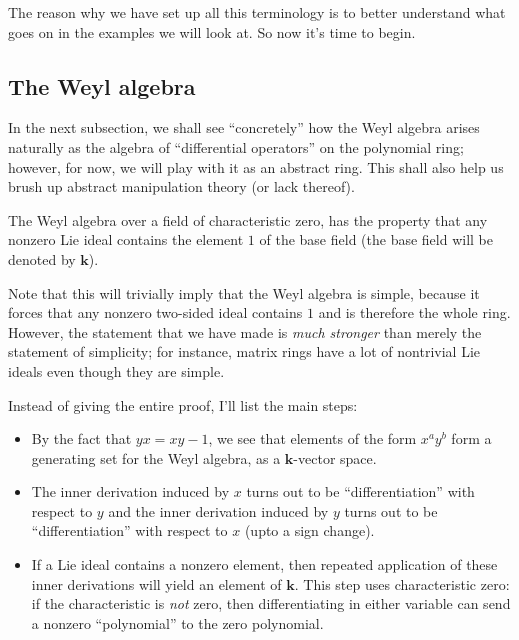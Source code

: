 \documentclass[a4paper]{amsart}
\newcommand{\field}{\mathbf{k}}
\begin{document}
The reason why we have set up all this terminology is to better understand
what goes on in the examples we will look at. So now it's time to begin.

\subsection{The Weyl algebra}

In the next subsection, we shall see ``concretely'' how the Weyl algebra
arises naturally as the algebra of ``differential operators'' on the
polynomial ring; however, for now, we will play with it as an abstract
ring. This shall also help us brush up abstract manipulation theory
(or lack thereof).

\begin{theorem}
  The Weyl algebra over a field of characteristic zero, has the
  property that any nonzero Lie ideal contains the element $1$ of the
  base field (the base field will be denoted by $\field$).
\end{theorem}

Note that this will trivially imply that the Weyl algebra is simple,
because it forces that any nonzero two-sided ideal contains $1$ and is
therefore the whole ring. However, the statement that we have made is
{\em much stronger} than merely the statement of simplicity; for
instance, matrix rings have a lot of nontrivial Lie ideals even though
they are simple.

Instead of giving the entire proof, I'll list the main steps:

\begin{itemize}

\item By the fact that $yx = xy - 1$, we see that elements of the form
  $x^ay^b$ form a generating set for the Weyl algebra, as a
  $\field$-vector space.

\item The inner derivation induced by $x$ turns out to be
  ``differentiation'' with respect to $y$ and the inner derivation
  induced by $y$ turns out to be ``differentiation'' with respect to
  $x$ (upto a sign change).

\item If a Lie ideal contains a nonzero element, then repeated
  application of these inner derivations will yield an element of
  $\field$. This step uses characteristic zero: if the characteristic
  is {\em not} zero, then differentiating in either variable can
  send a nonzero ``polynomial'' to the zero polynomial.

\end{itemize}
\end{document}
